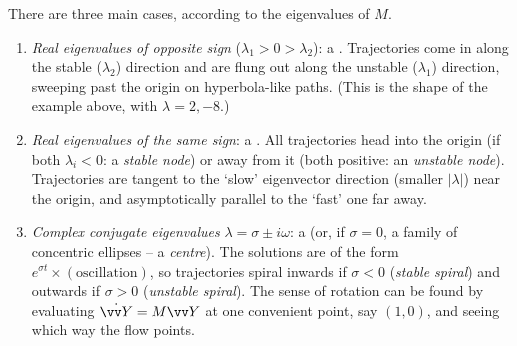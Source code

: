 There are three main cases, according to the eigenvalues of $M$.

\begin{enumerate}[label=(\arabic*)]
	\item \emph{Real eigenvalues of opposite sign} ($\lambda_1 > 0 > \lambda_2$): a . Trajectories come in along the stable ($\lambda_2$) direction and are flung out along the unstable ($\lambda_1$) direction, sweeping past the origin on hyperbola-like paths. (This is the shape of the example above, with $\lambda = 2, -8$.)
	\item \emph{Real eigenvalues of the same sign}: a . All trajectories head into the origin (if both $\lambda_i < 0$: a \emph{stable node}) or away from it (both positive: an \emph{unstable node}). Trajectories are tangent to the `slow' eigenvector direction (smaller $|\lambda|$) near the origin, and asymptotically parallel to the `fast' one far away.
	\item \emph{Complex conjugate eigenvalues} $\lambda = \sigma \pm i\omega$: a  (or, if $\sigma = 0$, a family of concentric ellipses -- a \emph{centre}). The solutions are of the form $e^{\sigma t} \times (\text{oscillation})$, so trajectories spiral inwards if $\sigma < 0$ (\emph{stable spiral}) and outwards if $\sigma > 0$ (\emph{unstable spiral}). The sense of rotation can be found by evaluating $\dot{\vv Y} = M \vv Y$ at one convenient point, say $(1, 0)$, and seeing which way the flow points.
\end{enumerate}

